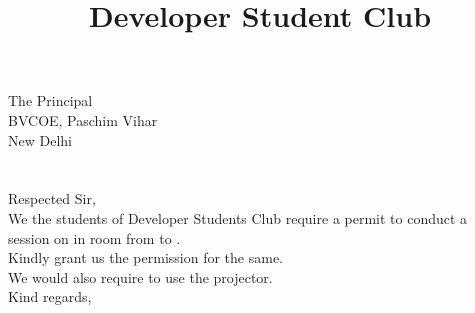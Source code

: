 \documentclass[12pt,a4paper]{article} %
\title{Developer Student Club}
\begin{document}
	
	
	\date{}
	\maketitle
	\hspace{-8mm}
	The Principal \\
	BVCOE, Paschim Vihar\\
	New Delhi\\
	\linebreak
	\\
	\linebreak
	\textbf{}\\
	\linebreak
	Respected Sir,\\
	
	\vspace{-5mm}
	\hspace{8mm}
	We the students of Developer Students Club require a permit to conduct a session on 
	in room
	from 
	to 
	.\\
	Kindly grant us the permission for the same. \\
	We would also require to use the projector.\\
	\linebreak
	Kind regards,\\
	\\
	
\end{document}
